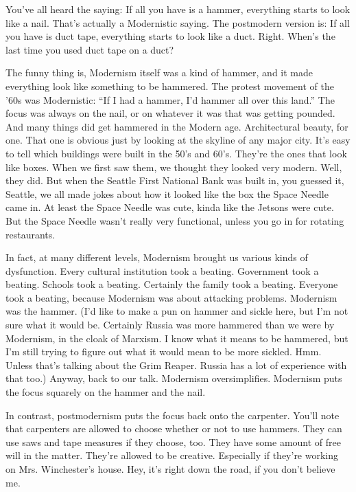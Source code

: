 You've all heard the saying: If all you have is a hammer, everything starts
to look like a nail. That's actually a Modernistic saying. The postmodern
version is: If all you have is duct tape, everything starts to look like a
duct. Right. When's the last time you used duct tape on a duct?

The funny thing is, Modernism itself was a kind of hammer, and it made
everything look like something to be hammered. The protest movement of the '60s
was Modernistic: ``If I had a hammer, I'd hammer all over this land.''
The focus was always on the nail, or on whatever it was that was getting
pounded. And many things did get hammered in the Modern age. Architectural
beauty, for one. That one is obvious just by looking at the skyline of any
major city. It's easy to tell which buildings were built in the 50's and
60's. They're the ones that look like boxes. When we first saw them, we
thought they looked very modern. Well, they did. But when the Seattle First
National Bank was built in, you guessed it, Seattle, we all made jokes about
how it looked like the box the Space Needle came in. At least the Space
Needle was cute, kinda like the Jetsons were cute. But the Space Needle
wasn't really very functional, unless you go in for rotating restaurants.

In fact, at many different levels, Modernism brought us various kinds of
dysfunction. Every cultural institution took a beating. Government took a
beating. Schools took a beating. Certainly the family took a beating.
Everyone took a beating, because Modernism was about attacking problems.
Modernism was the hammer. (I'd like to make a pun on hammer and sickle here,
but I'm not sure what it would be. Certainly Russia was more hammered than we
were by Modernism, in the cloak of Marxism. I know what it means to be
hammered, but I'm still trying to figure out what it would mean to be more
sickled. Hmm. Unless that's talking about the Grim Reaper. Russia has a lot
of experience with that too.) Anyway, back to our talk. Modernism
oversimplifies. Modernism puts the focus squarely on the hammer and the nail.

In contrast, postmodernism puts the focus back onto the carpenter. You'll
note that carpenters are allowed to choose whether or not to use hammers.
They can use saws and tape measures if they choose, too. They have some
amount of free will in the matter. They're allowed to be creative. Especially
if they're working on Mrs. Winchester's house. Hey, it's right down the road,
if you don't believe me.

